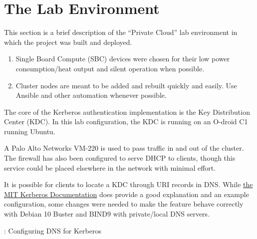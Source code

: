 \section{\label{sec:environment}The Lab Environment}
\vspace{2mm}
\justifying
This section is a brief description of the ``Private Cloud'' lab environment in which the project was built and deployed. 

\begin{raggedright}
	\begin{enumerate}
		\item Single Board Compute (SBC) devices were chosen for their low power consumption/heat output and silent operation when possible.
		\item Cluster nodes are meant to be added and rebuilt quickly and easily. Use Ansible and other automation whenever possible.
	\end{enumerate}
\end{raggedright}

\vspace{2mm}
\justifying
The core of the Kerberos authentication implementation is the Key Distribution Center (KDC). In this lab configuration, the KDC is running on
an O-droid C1 running Ubuntu.



\justifying
A Palo Alto Networks VM-220 is used to pass traffic in and out of the cluster. The firewall has also been configured to serve DHCP to clients,
though this service could be placed elsewhere in the network with minimal effort.

\vspace{2mm}
\vspace{2mm}

\justifying
It is possible for clients to locate a KDC through URI records in DNS. While \href{https://web.mit.edu/kerberos/www/krb5-latest/doc/admin/realm_config.html#kdc-discovery}{the MIT Kerberos Documentation}
does provide a good explanation and an example configuration, some changes were needed to make the feature behave correctly with Debian 10 Buster and BIND9 with private/local DNS servers.

\begin{mybox}{\thetcbcounter: Configuring DNS for Kerberos}
	
\end{mybox}

